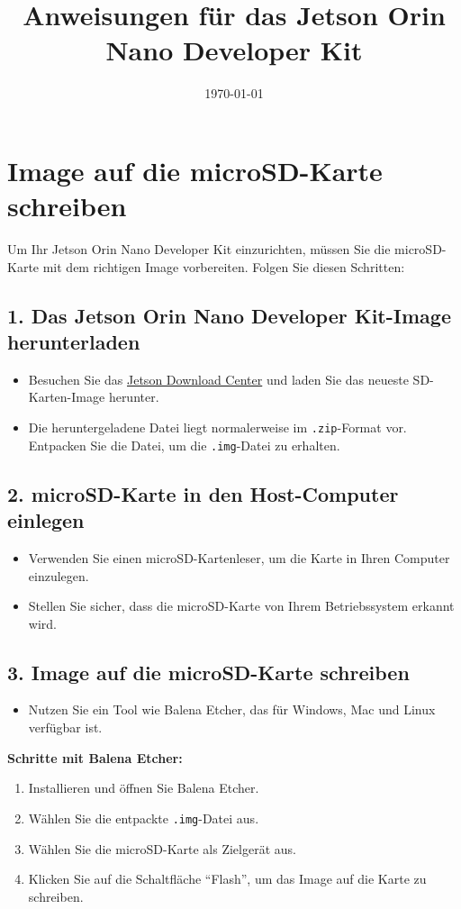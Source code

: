 \documentclass{article}
\title{Anweisungen für das Jetson Orin Nano Developer Kit}
\author{}
\date{\today}
\begin{document}
\maketitle

\section{Image auf die microSD-Karte schreiben}

Um Ihr Jetson Orin Nano Developer Kit einzurichten, müssen Sie die microSD-Karte mit dem richtigen Image vorbereiten. Folgen Sie diesen Schritten:

\subsection{1. Das Jetson Orin Nano Developer Kit-Image herunterladen}
\begin{itemize}
    \item Besuchen Sie das \href{https://developer.nvidia.com/embedded/downloads}{Jetson Download Center} und laden Sie das neueste SD-Karten-Image herunter.
    \item Die heruntergeladene Datei liegt normalerweise im \texttt{.zip}-Format vor. Entpacken Sie die Datei, um die \texttt{.img}-Datei zu erhalten.
\end{itemize}

\subsection{2. microSD-Karte in den Host-Computer einlegen}
\begin{itemize}
    \item Verwenden Sie einen microSD-Kartenleser, um die Karte in Ihren Computer einzulegen.
    \item Stellen Sie sicher, dass die microSD-Karte von Ihrem Betriebssystem erkannt wird.
\end{itemize}

\subsection{3. Image auf die microSD-Karte schreiben}
\begin{itemize}
    \item Nutzen Sie ein Tool wie Balena Etcher, das für Windows, Mac und Linux verfügbar ist.
\end{itemize}

\textbf{Schritte mit Balena Etcher:}
\begin{enumerate}
    \item Installieren und öffnen Sie Balena Etcher.
    \item Wählen Sie die entpackte \texttt{.img}-Datei aus.
    \item Wählen Sie die microSD-Karte als Zielgerät aus.
    \item Klicken Sie auf die Schaltfläche \textquotedblleft Flash\textquotedblright, um das Image auf die Karte zu schreiben.
\end{enumerate}
\end{document}
